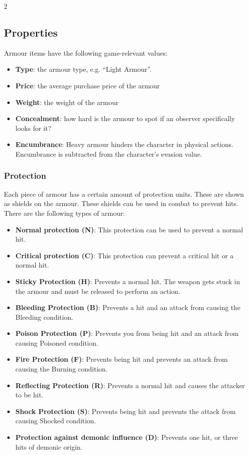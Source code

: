 \begin{multicols}{2}
\subsection{Properties}

Armour items have the following game-relevant values:
\begin{itemize}
    \item \textbf{Type}: the armour type, e.g. ``Light Armour''.
    \item \textbf{Price}: the average purchase price of the armour
    \item \textbf{Weight}: the weight of the armour
    \item \textbf{Concealment}: how hard is the armour to spot if an observer specifically looks for it?
    \item \textbf{Encumbrance}: Heavy armour hinders the character in physical actions. Encumbrance is subtracted from the character's evasion value.
\end{itemize}

\subsubsection{Protection}

Each piece of armour has a certain amount of protection units. These are shown as shields on the armour. These shields can be used in combat to prevent hits. There are the following types of armour:
\begin{itemize}
    \item \textbf{Normal protection (N)}: This protection can be used to prevent a normal hit.
    \item \textbf{Critical protection (C)}: This protection can prevent a critical hit or a normal hit.
    \item \textbf{Sticky Protection (H)}: Prevents a normal hit. The weapon gets stuck in the armour and must be released to perform an action.
    \item \textbf{Bleeding Protection (B)}: Prevents a hit and an attack from causing the Bleeding condition.
    \item \textbf{Poison Protection (P)}: Prevents you from being hit and an attack from causing Poisoned condition.
    \item \textbf{Fire Protection (F)}: Prevents being hit and prevents an attack from causing the Burning condition.
    \item \textbf{Reflecting Protection (R)}: Prevents a normal hit and causes the attacker to be hit.
    \item \textbf{Shock Protection (S)}: Prevents being hit and prevents the attack from causing Shocked condition.
    \item \textbf{Protection against demonic influence (D)}: Prevents one hit, or three hits of demonic origin.
\end{itemize}


\end{multicols}
